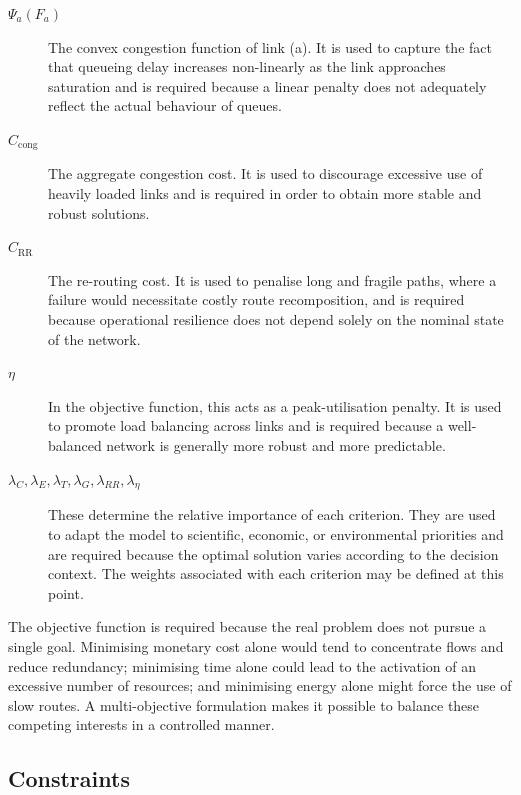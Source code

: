 \documentclass[a4paper,fleqn]{cas-dc}
\begin{document}
\begin{description}
\item[\(\Psi_a(F_a)\)] The convex congestion function of link (a). It is used to capture the fact that queueing delay increases non-linearly as the link approaches saturation and is required because a linear penalty does not adequately reflect the actual behaviour of queues. 

\item[\(C_{\mathrm{cong}}\)] The aggregate congestion cost. It is used to discourage excessive use of heavily loaded links and is required in order to obtain more stable and robust solutions. 

\item[\(C_{\mathrm{RR}}\)] The re-routing cost. It is used to penalise long and fragile paths, where a failure would necessitate costly route recomposition, and is required because operational resilience does not depend solely on the nominal state of the network. 

\item[\(\eta\)] In the objective function, this acts as a peak-utilisation penalty. It is used to promote load balancing across links and is required because a well-balanced network is generally more robust and more predictable. 

\item[\(\lambda_C,\lambda_E,\lambda_T,\lambda_G,\lambda_{RR},\lambda_{\eta}\)] These determine the relative importance of each criterion. They are used to adapt the model to scientific, economic, or environmental priorities and are required because the optimal solution varies according to the decision context. The weights associated with each criterion may be defined at this point.

\end{description}


The objective function is required because the real problem does not pursue a single goal. Minimising monetary cost alone would tend to concentrate flows and reduce redundancy; minimising time alone could lead to the activation of an excessive number of resources; and minimising energy alone might force the use of slow routes. A multi-objective formulation makes it possible to balance these competing interests in a controlled manner.



\subsection{Constraints}
\end{document}
